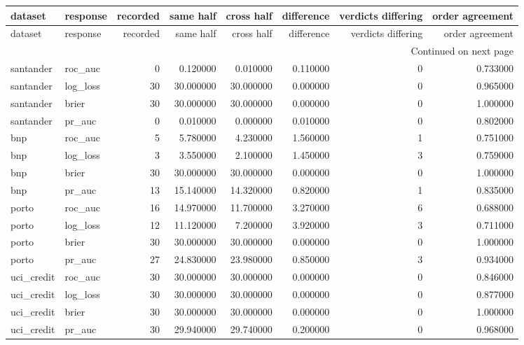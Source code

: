\begin{center}\label{tab:s6split}\end{center}
\begingroup\scriptsize\setlength{\tabcolsep}{2.5pt}
\begin{longtable}{llrrrrrr}
\toprule
dataset & response & recorded & same half & cross half & difference & verdicts differing & order agreement \\
\midrule
\endfirsthead
\toprule
dataset & response & recorded & same half & cross half & difference & verdicts differing & order agreement \\
\midrule
\endhead
\midrule
\multicolumn{8}{r}{Continued on next page} \\
\midrule
\endfoot
\bottomrule
\endlastfoot
santander & roc\_auc & 0 & 0.120000 & 0.010000 & 0.110000 & 0 & 0.733000 \\
santander & log\_loss & 30 & 30.000000 & 30.000000 & 0.000000 & 0 & 0.965000 \\
santander & brier & 30 & 30.000000 & 30.000000 & 0.000000 & 0 & 1.000000 \\
santander & pr\_auc & 0 & 0.010000 & 0.000000 & 0.010000 & 0 & 0.802000 \\
bnp & roc\_auc & 5 & 5.780000 & 4.230000 & 1.560000 & 1 & 0.751000 \\
bnp & log\_loss & 3 & 3.550000 & 2.100000 & 1.450000 & 3 & 0.759000 \\
bnp & brier & 30 & 30.000000 & 30.000000 & 0.000000 & 0 & 1.000000 \\
bnp & pr\_auc & 13 & 15.140000 & 14.320000 & 0.820000 & 1 & 0.835000 \\
porto & roc\_auc & 16 & 14.970000 & 11.700000 & 3.270000 & 6 & 0.688000 \\
porto & log\_loss & 12 & 11.120000 & 7.200000 & 3.920000 & 3 & 0.711000 \\
porto & brier & 30 & 30.000000 & 30.000000 & 0.000000 & 0 & 1.000000 \\
porto & pr\_auc & 27 & 24.830000 & 23.980000 & 0.850000 & 3 & 0.934000 \\
uci\_credit & roc\_auc & 30 & 30.000000 & 30.000000 & 0.000000 & 0 & 0.846000 \\
uci\_credit & log\_loss & 30 & 30.000000 & 30.000000 & 0.000000 & 0 & 0.877000 \\
uci\_credit & brier & 30 & 30.000000 & 30.000000 & 0.000000 & 0 & 1.000000 \\
uci\_credit & pr\_auc & 30 & 29.940000 & 29.740000 & 0.200000 & 0 & 0.968000 \\
\end{longtable}\endgroup\addtocounter{table}{-1}
